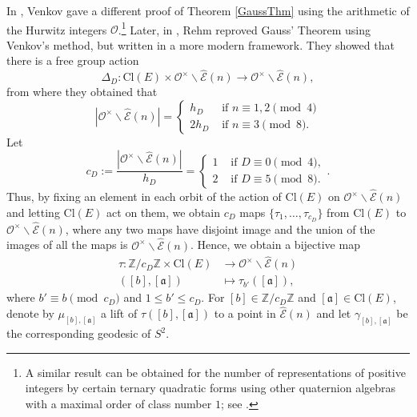 \documentclass[11pt]{amsart}
\newcommand{\bigo}{\mathcal{O}}
\newcommand{\Z}{\mathbb{Z}}
\renewcommand{\a}{\mathfrak{a}}
\theoremstyle{definition}
\theoremstyle{remark}
\begin{document}
In \cite{VenkovGaussThm}, Venkov gave a different proof of Theorem \ref{GaussThm} using the arithmetic of the Hurwitz integers $\bigo$.\footnote{A similar result can be obtained for the number of representations of positive integers by certain ternary quadratic forms using other quaternion algebras with a maximal order of class number $1$; see \cite{ShemanskeActionCLEonEn}.} Later, in \cite{RehmActionCLEonEn}, Rehm reproved Gauss' Theorem using Venkov's method, but written in a more modern framework. They showed that there is a free group action $$\Delta_{D} : \mathrm{Cl}(E) \times \bigo^{\times} \backslash \widehat{\mathcal{E}}(n) \longrightarrow \bigo^{\times} \backslash \widehat{\mathcal{E}}(n),$$ from where they obtained that
\begin{equation*}
    |\bigo^{\times} \backslash \widehat{\mathcal{E}}(n)| = \left\{ \begin{array}{ll}
        h_D & \text{ if } n\equiv 1,2 \pmod{4} \\
        2h_D & \text{ if } n\equiv 3 \pmod{8}.
    \end{array} \right.
\end{equation*}
Let $$c_D := \frac{|\bigo^{\times} \backslash \widehat{\mathcal{E}}(n)|}{h_D} = \left\{ \begin{array}{ll}
    1 & \text{ if } D\equiv 0 \pmod{4}, \\
    2 & \text{ if } D\equiv 5 \pmod{8}.
\end{array} \right..$$
Thus, by fixing an element in each orbit of the action of $\mathrm{Cl}(E)$ on $\bigo^{\times} \backslash \widehat{\mathcal{E}}(n)$ and letting $\mathrm{Cl}(E)$ act on them, we obtain $c_D$ maps $\{\tau_1, \dots, \tau_{c_D}\}$ from $\mathrm{Cl}(E)$ to $\bigo^{\times}\backslash \widehat{\mathcal{E}}(n)$, where any two maps have disjoint image and the union of the images of all the maps is $\bigo^{\times} \backslash \widehat{\mathcal{E}}(n)$. Hence, we obtain a bijective map
\begin{align*}
    \tau : \Z/c_D \Z \times \mathrm{Cl}(E) &\longrightarrow \bigo^{\times} \backslash \widehat{\mathcal{E}}(n) \\
    ([b],[\a]) &\longmapsto \tau_{b'}([\a]),
\end{align*}
where $b' \equiv b \pmod{c_D}$ and $1\leq b' \leq c_D$. For $[b] \in \Z/c_D \Z$ and $[\a] \in \mathrm{Cl}(E)$, denote by $\mu_{[b],[\a]}$ a lift of $\tau([b],[\a])$ to a point in $\widehat{\mathcal{E}}(n)$ and let $\gamma_{[b],[\a]}$ be the corresponding geodesic of $S^2$.
\end{document}
